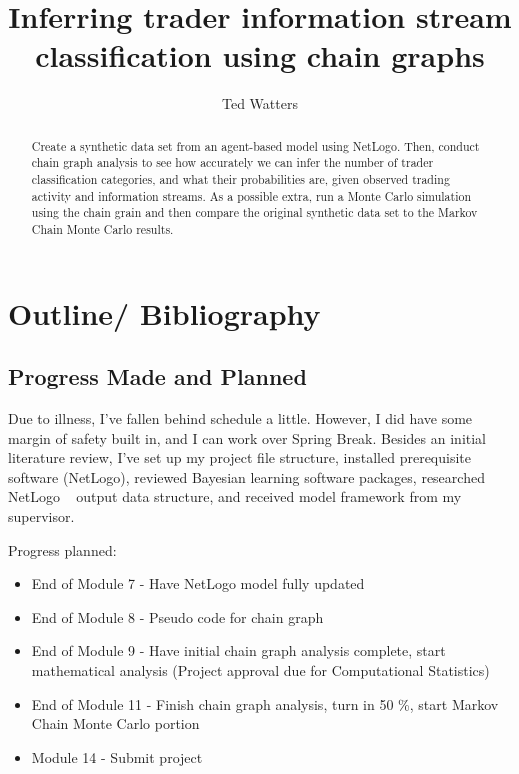 \documentclass[a4paper, 11pt]{report}
\title{Inferring trader information stream classification using chain graphs}
\author{Ted Watters}
\begin{document}
\maketitle

\begin{abstract}
	Create a synthetic data set from an agent-based model using NetLogo. Then, conduct chain graph analysis to see how accurately we can infer the number of trader classification categories, and what their probabilities are, given observed trading activity and information streams. As a possible extra, run a Monte Carlo simulation using the chain grain and then compare the original synthetic data set to the Markov Chain Monte Carlo results.
\end{abstract}
\section{Outline/ Bibliography}
\subsection{Progress Made and Planned}
Due to illness, I've fallen behind schedule a little. However, I did have some margin of safety built in, and I can work over Spring Break. Besides an initial literature review, I've set up my project file structure, installed prerequisite software (NetLogo), reviewed Bayesian learning software packages, researched NetLogo ~\cite{netlogo} output data structure, and received model framework from my supervisor.


\noindent Progress planned:
\begin{itemize}
\item End of Module 7 - Have NetLogo model fully updated
\item End of Module 8 - Pseudo code for chain graph
\item End of Module 9 - Have initial chain graph analysis complete, start mathematical analysis (Project approval due for Computational Statistics)
\item End of Module 11 - Finish chain graph analysis, turn in 50 \%, start Markov Chain Monte Carlo portion
\item Module 14 - Submit project
\end{itemize}
\end{document}
